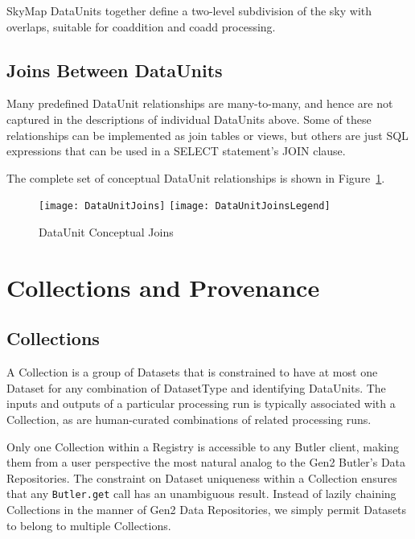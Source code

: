 \documentclass[DM,toc]{lsstdoc}
\newcommand{\unitinc}[1]{}
\newcommand{\joininc}[1]{}
\begin{document}
SkyMap DataUnits together define a two-level subdivision of the sky with overlaps, suitable for coaddition and coadd processing.

\unitinc{SkyMap}
\unitinc{Tract}
\unitinc{Patch}

\subsection{Joins Between DataUnits}
\label{sec:joins-between-dataunits}

Many predefined DataUnit relationships are many-to-many, and hence are not captured in the descriptions of individual DataUnits above.
Some of these relationships can be implemented as join tables or views, but others are just SQL expressions that can be used in a SELECT statement's JOIN clause.

The complete set of conceptual DataUnit relationships is shown in Figure~\ref{fig:DataUnitJoins}.

\begin{figure}
    \centering
    \texttt{[image: DataUnitJoins]}
    \texttt{[image: DataUnitJoinsLegend]}
    \caption{DataUnit Conceptual Joins}
    \label{fig:DataUnitJoins}
\end{figure}

\joininc{VisitSensorRegion}
\joininc{ExposureRangeJoin}
\joininc{MultiCameraExposureJoin}
\joininc{VisitSensorSkyPixJoin}
\joininc{VisitSkyPixJoin}
\joininc{PatchSkyPixJoin}
\joininc{TractSkyPixJoin}
\joininc{VisitSensorPatchJoin}
\joininc{VisitPatchJoin}
\joininc{VisitSensorTractJoin}
\joininc{VisitTractJoin}

\section{Collections and Provenance}
\label{sec:collections-and-provenance}

\subsection{Collections}
\label{sec:collections}

A Collection is a group of Datasets that is constrained to have at most one Dataset for any combination of DatasetType and identifying DataUnits.
The inputs and outputs of a particular processing run is typically associated with a Collection, as are human-curated combinations of related processing runs.

Only one Collection within a Registry is accessible to any Butler client, making them from a user perspective the most natural analog to the Gen2 Butler's Data Repositories.
The constraint on Dataset uniqueness within a Collection ensures that any \texttt{Butler.get} call has an unambiguous result.
Instead of lazily chaining Collections in the manner of Gen2 Data Repositories, we simply permit Datasets to belong to multiple Collections.
\end{document}
